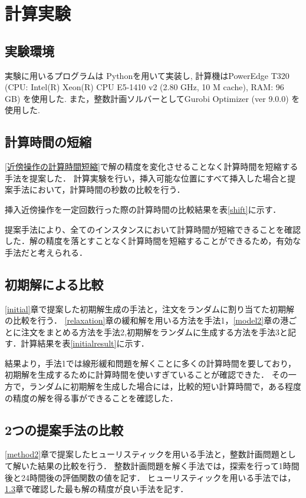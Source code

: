 \chapter{計算実験}\label{computational_result}
\section{実験環境}
実験に用いるプログラムは Pythonを用いて実装し, 計算機はPowerEdge T320 (CPU: Intel(R) Xeon(R) CPU E5-1410 v2 (2.80 GHz, 10 M cache), RAM: 96 GB) を使用した. また，整数計画ソルバーとしてGurobi Optimizer (ver 9.0.0) を使用した.

\section{計算時間の短縮}
\ref{近傍操作の計算時間短縮}で解の精度を変化させることなく計算時間を短縮する手法を提案した．
計算実験を行い，挿入可能な位置にすべて挿入した場合と提案手法において，計算時間の秒数の比較を行う．

挿入近傍操作を一定回数行った際の計算時間の比較結果を表\ref{shift}に示す．

提案手法により、全てのインスタンスにおいて計算時間が短縮できることを確認した．解の精度を落とすことなく計算時間を短縮することができるため，有効な手法だと考えられる．

\section{初期解による比較}
\label{sectioninitial}
\ref{initial}章で提案した初期解生成の手法と，注文をランダムに割り当てた初期解の比較を行う．
\ref{relaxation}章の緩和解を用いる方法を手法1，\ref{model2}章の港ごとに注文をまとめる方法を手法2,初期解をランダムに生成する方法を手法3と記す．計算結果を表\ref{initialresult}に示す．

結果より，手法1では線形緩和問題を解くことに多くの計算時間を要しており，初期解を生成するために計算時間を使いすぎていることが確認できた．
その一方で，ランダムに初期解を生成した場合には，比較的短い計算時間で，ある程度の精度の解を得る事ができることを確認した．


\section{2つの提案手法の比較}
\ref{method2}章で提案したヒューリスティックを用いる手法と，整数計画問題として解いた結果の比較を行う．
整数計画問題を解く手法では，探索を行って1時間後と24時間後の評価関数の値を記す．
ヒューリスティックを用いる手法では，\ref{sectioninitial}章で確認した最も解の精度が良い手法を記す．

